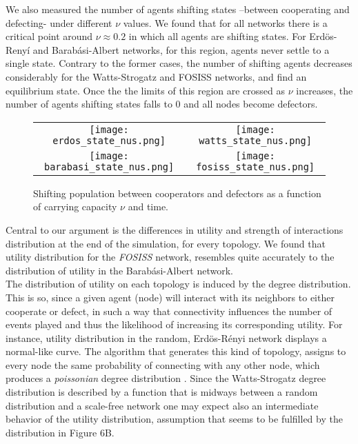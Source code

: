 \documentclass[11pt]{article}
\begin{document}
\FloatBarrier

We also measured the number of agents shifting states --between cooperating and
defecting- under different $\nu$ values. We found that for all networks there is
a critical point around  $\nu \approx 0.2$ in which all agents are shifting
states. For Erd\"{o}s-Reny\'i and Barab\'asi-Albert networks, for this region,
agents never settle to a single state. Contrary to the former cases, the number
of shifting agents decreases considerably for the Watts-Strogatz and FOSISS
networks, and find an equilibrium state. Once the the limits of this region are
crossed as $\nu$ increases, the number of agents shifting states falls to $0$
and all nodes become defectors. 


\begin{figure} [h!]
\centering
\begin{tabular}{cc}

\texttt{[image: erdos\_state\_nus.png]} & \texttt{[image: watts\_state\_nus.png]} \\
\texttt{[image: barabasi\_state\_nus.png]} & \texttt{[image: fosiss\_state\_nus.png]}
\end{tabular}
\caption{Shifting population between cooperators and defectors as a function of
  carrying capacity $\nu$ and time.}\label{state} 
\end{figure}

\FloatBarrier

Central to our argument is the differences in utility and strength of
interactions distribution at the end of the simulation, for every topology. We
found that utility distribution for the \textit{FOSISS} network, resembles quite
accurately to the distribution of utility in the Barab\'asi-Albert
network.\\ 


The distribution of utility on each topology is induced by the degree
distribution. This is so, since a given agent (node) will interact with its
neighbors to either cooperate or defect, in such a way that connectivity
influences the number of events played and thus the likelihood of increasing its
corresponding utility. For instance, utility distribution in the random,
Erd\"{o}s-R\'enyi network displays a normal-like curve. The algorithm that
generates this kind of topology, assigns to every node the same probability of
connecting with any other node, which produces a \textit{poissonian} degree
distribution \cite{Erdos1959}. Since the Watts-Strogatz degree distribution is
described by a function that is midways between a random distribution and a
scale-free network \cite{Barrat2000} one may expect also  an intermediate
behavior of the utility distribution, assumption that seems to be fulfilled by
the distribution in Figure 6B. 
\end{document}
